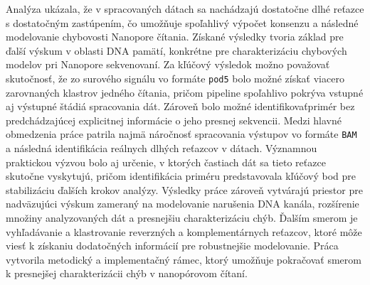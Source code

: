 Analýza ukázala, že v spracovaných dátach sa nachádzajú dostatočne dlhé reťazce
s dostatočným zastúpením, čo umožňuje spoľahlivý výpočet konsenzu a následné
modelovanie chybovosti Nanopore čítania. Získané výsledky tvoria základ
pre ďalší výskum v oblasti DNA pamätí, konkrétne pre charakterizáciu
chybových modelov pri Nanopore sekvenovaní.
Za kľúčový výsledok možno považovať skutočnosť, že zo surového signálu vo formáte
\texttt{pod5} bolo možné získať viacero zarovnaných klastrov jedného čítania,
pričom pipeline spoľahlivo pokrýva vstupné aj výstupné štádiá spracovania dát.
Zároveň bolo možné identifikovaťprimér bez predchádzajúcej explicitnej informácie
o jeho presnej sekvencii.
Medzi hlavné obmedzenia práce patrila najmä náročnosť spracovania výstupov vo formáte
\texttt{BAM} a následná identifikácia reálnych dlhých reťazcov v dátach. Významnou
praktickou výzvou bolo aj určenie, v ktorých častiach dát sa tieto reťazce skutočne
vyskytujú, pričom identifikácia priméru predstavovala kľúčový bod pre stabilizáciu
ďalších krokov analýzy.
Výsledky práce zároveň vytvárajú priestor pre nadväzujúci výskum zameraný na
modelovanie narušenia DNA kanála, rozšírenie množiny analyzovaných dát a presnejšiu
charakterizáciu chýb. Ďalším smerom je vyhľadávanie a klastrovanie reverzných a
komplementárnych reťazcov, ktoré môže viesť k získaniu dodatočných informácií
pre robustnejšie modelovanie.
Práca vytvorila metodický a implementačný rámec, ktorý umožňuje pokračovať smerom
k presnejšej charakterizácii chýb v nanopórovom čítaní.
